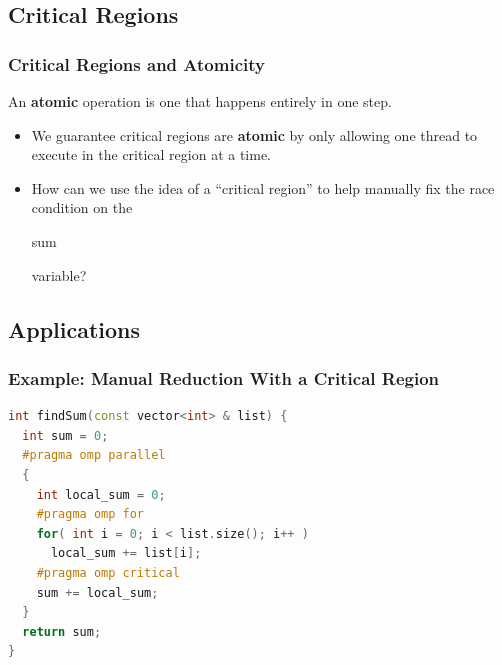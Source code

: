 \documentclass[table]{beamer}
\newcommand{\ttt}[1]{\begin{tt}#1\end{tt}}
\begin{document}
\subsection{Critical Regions}
\begin{frame}
    \frametitle{Critical Regions and Atomicity}
    \begin{definition}
        An \textbf{atomic} operation is one that happens entirely in one 
        step.
    \end{definition}
    \begin{itemize}
        \item<3-> We guarantee critical regions are \textbf{atomic} by only 
        allowing one thread to execute in the critical region at a time.
        \item<4-> How can we use the idea of a ``critical region'' to help 
        manually fix the race condition on the \ttt{sum} variable?
    \end{itemize}
\end{frame}

\subsection{Applications}
\begin{frame}[fragile]
    \frametitle{Example: Manual Reduction With a Critical Region}
\begin{lstlisting}[language=C++]
int findSum(const vector<int> & list) {
  int sum = 0;
  #pragma omp parallel
  {
    int local_sum = 0;
    #pragma omp for
    for( int i = 0; i < list.size(); i++ )
      local_sum += list[i];
    #pragma omp critical
    sum += local_sum;
  }
  return sum;
}
\end{lstlisting}
\end{frame}
\end{document}
